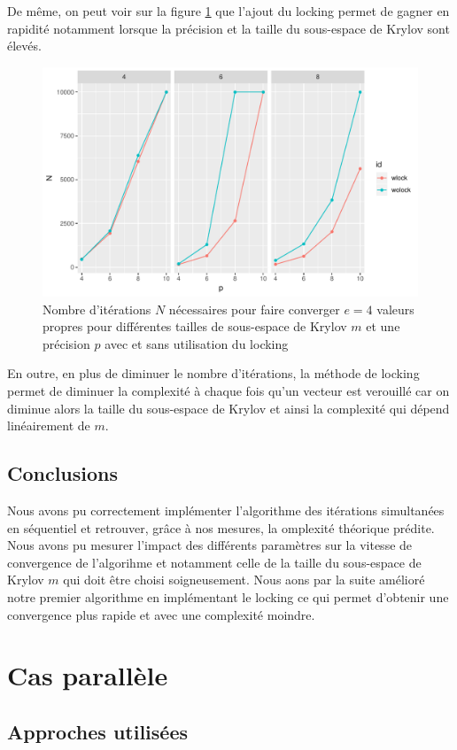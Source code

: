 \documentclass[11pt,a4paper]{article}
\begin{document}
		De même, on peut voir sur la figure \ref{fig:Nvsp_complock} que l'ajout du locking permet de gagner en rapidité notamment lorsque la précision et la taille du sous-espace de Krylov sont élevés.

		\begin{figure}
			\centering
			\includegraphics[width=0.8\linewidth, keepaspectratio]{plots/Nvsp_complock.pdf}
			\caption{Nombre d'itérations $N$ nécessaires pour faire converger $e = 4$ valeurs propres pour différentes tailles de sous-espace de Krylov $m$ et une précision $p$ avec et sans utilisation du locking \label{fig:Nvsp_complock}}
		\end{figure}

		En outre, en plus de diminuer le nombre d'itérations, la méthode de locking permet de diminuer la complexité à chaque fois qu'un vecteur est verouillé car on diminue alors la taille du sous-espace de Krylov et ainsi la complexité qui dépend linéairement de $m$.

	\subsection{Conclusions}
		Nous avons pu correctement implémenter l'algorithme des itérations simultanées en séquentiel et retrouver, grâce à nos mesures, la omplexité théorique prédite. Nous avons pu mesurer l'impact des différents paramètres sur la vitesse de convergence de l'algorihme et notamment celle de la taille du sous-espace de Krylov $m$ qui doit être choisi soigneusement. Nous aons par la suite amélioré notre premier algorithme en implémentant le locking ce qui permet d'obtenir une convergence plus rapide et avec une complexité moindre.

\section{Cas parallèle}
	\subsection{Approches utilisées}
\end{document}
